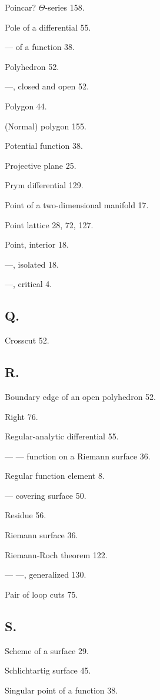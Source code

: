 \documentclass{article}
\begin{document}
Poincar? $\Theta$-series 158.

Pole of a differential 55.

--- of a function 38.

Polyhedron 52.

---, closed and open 52.

Polygon 44.

(Normal) polygon 155.

Potential function 38.

Projective plane 25.

Prym differential 129.

Point of a two-dimensional manifold 17.

Point lattice 28, 72, 127.

Point, interior 18.

---, isolated 18.

---, critical 4.

\subsection*{Q.}

Crosscut 52.

\subsection*{R.}

Boundary edge of an open polyhedron 52.

Right 76.

Regular-analytic differential 55.

--- --- function on a Riemann surface 36.

Regular function element 8.

--- covering surface 50.

Residue 56.

Riemann surface 36.

Riemann-Roch theorem 122.

--- ---, generalized 130.

Pair of loop cuts 75.

\subsection*{S.}

Scheme of a surface 29.

Schlichtartig surface 45.

Singular point of a function 38.
\end{document}
